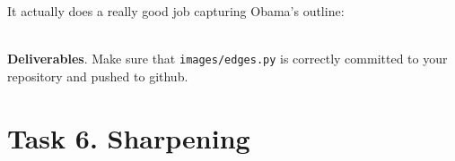 It actually does a really good job capturing Obama's outline:\\
~\\

\begin{minipage}{\linewidth}
\end{minipage}

\begin{callout}{\bcplume}
{\bf Deliverables}. Make sure that {\tt images/edges.py} is correctly committed to your repository and pushed to github. 
\end{callout}

\section{Task 6. Sharpening}

